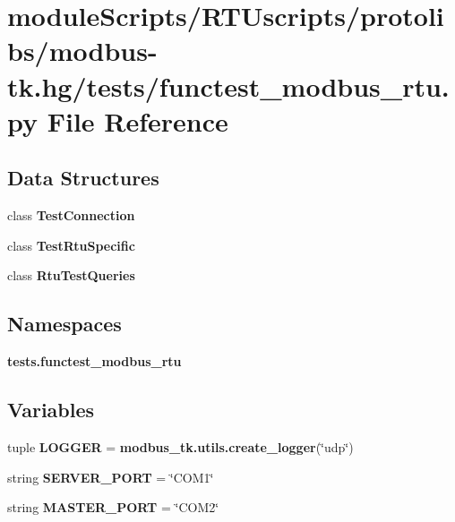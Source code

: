 \section{module\+Scripts/\+R\+T\+Uscripts/protolibs/modbus-\/tk.hg/tests/functest\+\_\+modbus\+\_\+rtu.py File Reference}
\label{functest__modbus__rtu_8py}
\subsection*{Data Structures}
\begin{DoxyCompactItemize}
\item 
class {\bf Test\+Connection}
\item 
class {\bf Test\+Rtu\+Specific}
\item 
class {\bf Rtu\+Test\+Queries}
\end{DoxyCompactItemize}
\subsection*{Namespaces}
\begin{DoxyCompactItemize}
\item 
 {\bf tests.\+functest\+\_\+modbus\+\_\+rtu}
\end{DoxyCompactItemize}
\subsection*{Variables}
\begin{DoxyCompactItemize}
\item 
tuple {\bf L\+O\+G\+G\+E\+R} = {\bf modbus\+\_\+tk.\+utils.\+create\+\_\+logger}(\char`\"{}udp\char`\"{})
\item 
string {\bf S\+E\+R\+V\+E\+R\+\_\+\+P\+O\+R\+T} = \char`\"{}C\+O\+M1\char`\"{}
\item 
string {\bf M\+A\+S\+T\+E\+R\+\_\+\+P\+O\+R\+T} = \char`\"{}C\+O\+M2\char`\"{}
\end{DoxyCompactItemize}
